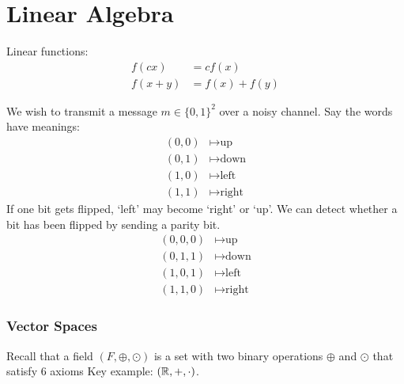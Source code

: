 
\part{Linear Algebra}

Linear functions:
\begin{align*}
    f(cx) &= c f(x) \\
    f(x + y) &= f(x) + f(y)
\end{align*}

\begin{example}
    We wish to transmit a message $m \in \{0, 1\}^2$ over a noisy channel.
    Say the words have meanings:
    \begin{align*}
        (0, 0) &\mapsto \text{up} \\
        (0, 1) &\mapsto \text{down} \\
        (1, 0) &\mapsto \text{left} \\
        (1, 1) &\mapsto \text{right}
    \end{align*}
    If one bit gets flipped, `left' may become `right' or `up'.
    We can detect whether a bit has been flipped by sending a parity bit.
    \begin{align*}
        (0, 0, 0) &\mapsto \text{up} \\
        (0, 1, 1) &\mapsto \text{down} \\
        (1, 0, 1) &\mapsto \text{left} \\
        (1, 1, 0) &\mapsto \text{right}
    \end{align*}
\end{example}

\section{Vector Spaces}
Recall that a field $(F, \oplus, \odot)$ is a set with two binary operations $\oplus$ and $\odot$ that satisfy 6 axioms %
Key example: $(\mathbb{R}, +, \cdot)$.

